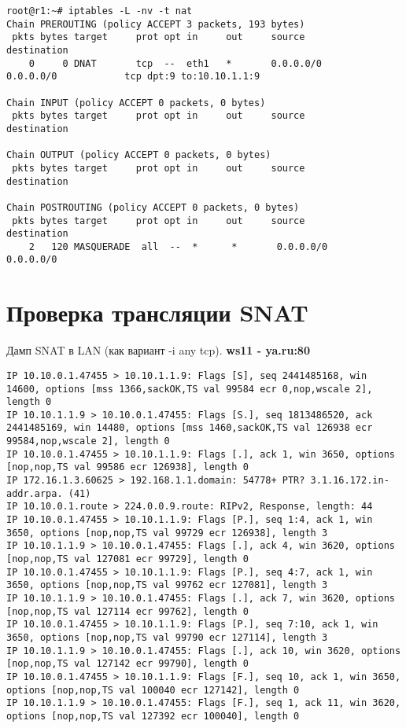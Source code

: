 \documentclass[a4paper,12pt]{article}
\begin{document}
\begin{lstlisting}
root@r1:~# iptables -L -nv -t nat
Chain PREROUTING (policy ACCEPT 3 packets, 193 bytes)
 pkts bytes target     prot opt in     out     source               destination         
    0     0 DNAT       tcp  --  eth1   *       0.0.0.0/0            0.0.0.0/0            tcp dpt:9 to:10.10.1.1:9

Chain INPUT (policy ACCEPT 0 packets, 0 bytes)
 pkts bytes target     prot opt in     out     source               destination         

Chain OUTPUT (policy ACCEPT 0 packets, 0 bytes)
 pkts bytes target     prot opt in     out     source               destination         

Chain POSTROUTING (policy ACCEPT 0 packets, 0 bytes)
 pkts bytes target     prot opt in     out     source               destination         
    2   120 MASQUERADE  all  --  *      *       0.0.0.0/0            0.0.0.0/0 
\end{lstlisting}

\section{Проверка трансляции SNAT}

Дамп SNAT в LAN (как вариант -i any tcp). \textbf{ws11 - ya.ru:80}

\begin{lstlisting}
IP 10.10.0.1.47455 > 10.10.1.1.9: Flags [S], seq 2441485168, win 14600, options [mss 1366,sackOK,TS val 99584 ecr 0,nop,wscale 2], length 0
IP 10.10.1.1.9 > 10.10.0.1.47455: Flags [S.], seq 1813486520, ack 2441485169, win 14480, options [mss 1460,sackOK,TS val 126938 ecr 99584,nop,wscale 2], length 0
IP 10.10.0.1.47455 > 10.10.1.1.9: Flags [.], ack 1, win 3650, options [nop,nop,TS val 99586 ecr 126938], length 0
IP 172.16.1.3.60625 > 192.168.1.1.domain: 54778+ PTR? 3.1.16.172.in-addr.arpa. (41)
IP 10.10.0.1.route > 224.0.0.9.route: RIPv2, Response, length: 44
IP 10.10.0.1.47455 > 10.10.1.1.9: Flags [P.], seq 1:4, ack 1, win 3650, options [nop,nop,TS val 99729 ecr 126938], length 3
IP 10.10.1.1.9 > 10.10.0.1.47455: Flags [.], ack 4, win 3620, options [nop,nop,TS val 127081 ecr 99729], length 0
IP 10.10.0.1.47455 > 10.10.1.1.9: Flags [P.], seq 4:7, ack 1, win 3650, options [nop,nop,TS val 99762 ecr 127081], length 3
IP 10.10.1.1.9 > 10.10.0.1.47455: Flags [.], ack 7, win 3620, options [nop,nop,TS val 127114 ecr 99762], length 0
IP 10.10.0.1.47455 > 10.10.1.1.9: Flags [P.], seq 7:10, ack 1, win 3650, options [nop,nop,TS val 99790 ecr 127114], length 3
IP 10.10.1.1.9 > 10.10.0.1.47455: Flags [.], ack 10, win 3620, options [nop,nop,TS val 127142 ecr 99790], length 0
IP 10.10.0.1.47455 > 10.10.1.1.9: Flags [F.], seq 10, ack 1, win 3650, options [nop,nop,TS val 100040 ecr 127142], length 0
IP 10.10.1.1.9 > 10.10.0.1.47455: Flags [F.], seq 1, ack 11, win 3620, options [nop,nop,TS val 127392 ecr 100040], length 0
\end{lstlisting}
\end{document}
